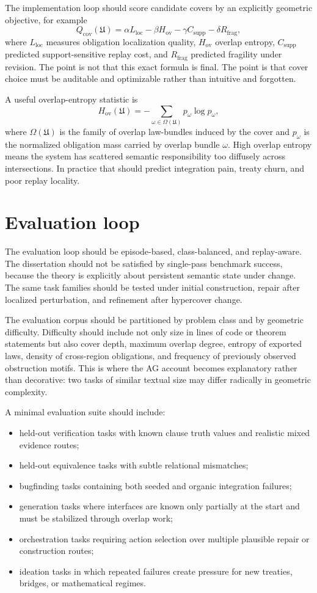 \documentclass[11pt]{report}
\begin{document}
The implementation loop should score candidate covers by an explicitly geometric objective, for example
\[
Q_{\mathrm{cov}}(\mathfrak{U})
=
\alpha L_{\mathrm{loc}}
-
\beta H_{\mathrm{ov}}
-
\gamma C_{\mathrm{supp}}
-
\delta R_{\mathrm{frag}},
\]
where $L_{\mathrm{loc}}$ measures obligation localization quality, $H_{\mathrm{ov}}$ overlap entropy, $C_{\mathrm{supp}}$ predicted support-sensitive replay cost, and $R_{\mathrm{frag}}$ predicted fragility under revision. The point is not that this exact formula is final. The point is that cover choice must be auditable and optimizable rather than intuitive and forgotten.

A useful overlap-entropy statistic is
\[
H_{\mathrm{ov}}(\mathfrak{U})
=
-\sum_{\omega \in \Omega(\mathfrak{U})} p_\omega \log p_\omega,
\]
where $\Omega(\mathfrak{U})$ is the family of overlap law-bundles induced by the cover and $p_\omega$ is the normalized obligation mass carried by overlap bundle $\omega$. High overlap entropy means the system has scattered semantic responsibility too diffusely across intersections. In practice that should predict integration pain, treaty churn, and poor replay locality.

\section{Evaluation loop}
The evaluation loop should be episode-based, class-balanced, and replay-aware. The dissertation should not be satisfied by single-pass benchmark success, because the theory is explicitly about persistent semantic state under change. The same task families should be tested under initial construction, repair after localized perturbation, and refinement after hypercover change.

The evaluation corpus should be partitioned by problem class and by geometric difficulty. Difficulty should include not only size in lines of code or theorem statements but also cover depth, maximum overlap degree, entropy of exported laws, density of cross-region obligations, and frequency of previously observed obstruction motifs. This is where the AG account becomes explanatory rather than decorative: two tasks of similar textual size may differ radically in geometric complexity.

A minimal evaluation suite should include:
\begin{itemize}
\item held-out verification tasks with known clause truth values and realistic mixed evidence routes;
\item held-out equivalence tasks with subtle relational mismatches;
\item bugfinding tasks containing both seeded and organic integration failures;
\item generation tasks where interfaces are known only partially at the start and must be stabilized through overlap work;
\item orchestration tasks requiring action selection over multiple plausible repair or construction routes;
\item ideation tasks in which repeated failures create pressure for new treaties, bridges, or mathematical regimes.
\end{itemize}
\end{document}
